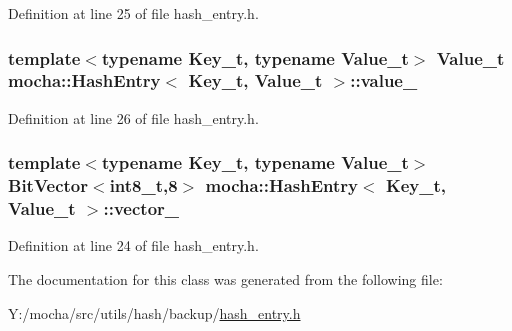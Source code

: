 Definition at line 25 of file hash\_\-entry.h.

\hypertarget{classmocha_1_1_hash_entry_a0334d07ef9c957ca8d3fb4b75219e13c}{
\subsubsection[{value\_\-}]{\setlength{\rightskip}{0pt plus 5cm}template$<$typename Key\_\-t, typename Value\_\-t$>$ Value\_\-t {\bf mocha::HashEntry}$<$ Key\_\-t, Value\_\-t $>$::{\bf value\_\-}}}
\label{classmocha_1_1_hash_entry_a0334d07ef9c957ca8d3fb4b75219e13c}


Definition at line 26 of file hash\_\-entry.h.

\hypertarget{classmocha_1_1_hash_entry_a474320a042bce9ced27c742951f5db9b}{
\subsubsection[{vector\_\-}]{\setlength{\rightskip}{0pt plus 5cm}template$<$typename Key\_\-t, typename Value\_\-t$>$ {\bf BitVector}$<$int8\_\-t,8$>$ {\bf mocha::HashEntry}$<$ Key\_\-t, Value\_\-t $>$::{\bf vector\_\-}}}
\label{classmocha_1_1_hash_entry_a474320a042bce9ced27c742951f5db9b}


Definition at line 24 of file hash\_\-entry.h.



The documentation for this class was generated from the following file:\begin{DoxyCompactItemize}
\item 
Y:/mocha/src/utils/hash/backup/\hyperlink{hash__entry_8h}{hash\_\-entry.h}\end{DoxyCompactItemize}
